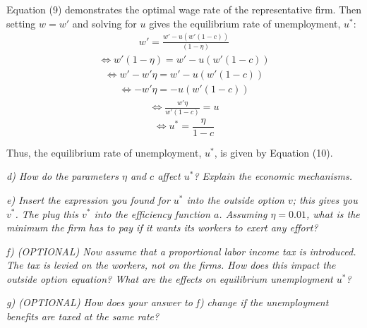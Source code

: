 \documentclass[11pt]{article} %
\begin{document}
\bigskip
Equation (9) demonstrates the optimal wage rate of the representative firm. Then setting $w=w'$ and solving for $u$ gives the equilibrium rate of unemployment, $u^*$:
\begin{align*}
    w' = \frac{w' - u\left(w' (1 - c)\right)} {(1 - \eta)}
\end{align*}
\begin{align*}
   \Longleftrightarrow w'(1 - \eta) = {w' - u\left(w' (1 - c)\right)} 
\end{align*}
\begin{align*}
   \Longleftrightarrow w' - w'\eta = {w' - u\left(w' (1 - c)\right)} 
\end{align*}
\begin{align*}
   \Longleftrightarrow - w'\eta = {- u\left(w' (1 - c)\right)} 
\end{align*}
\begin{align*}
   \Longleftrightarrow \frac{w' \eta}{w'(1-c)} = u 
\end{align*}
\begin{equation}
    \Longleftrightarrow u^* = \frac{\eta}{1-c}
\end{equation}

\bigskip
Thus, the equilibrium rate of unemployment, $u^*$, is given by Equation (10).






\pagebreak
\textit{d) How do the parameters $\eta$ and $c$ affect $u^*$? Explain the economic mechanisms.}




\pagebreak
\textit{e) Insert the expression you found for $u^*$ into the outside option $v$; this
gives you $v^*$. The plug this $v^*$ into the efficiency function $a$. Assuming
$\eta=0.01$, what is the minimum the firm has to pay if it wants its
workers to exert any effort?}




\pagebreak
\textit{f) (OPTIONAL) Now assume that a proportional labor income tax is
introduced. The tax is levied on the workers, not on the firms. How
does this impact the outside option equation? What are the effects on
equilibrium unemployment $u^*$?}




\pagebreak
\textit{g) (OPTIONAL) How does your answer to f) change if the unemployment
benefits are taxed at the same rate?}
\end{document}

